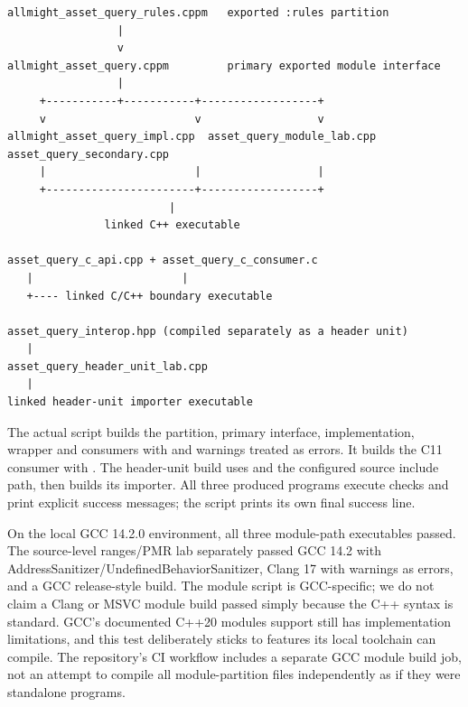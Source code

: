 \begin{verbatim}
allmight_asset_query_rules.cppm   exported :rules partition
                 |
                 v
allmight_asset_query.cppm         primary exported module interface
                 |
     +-----------+-----------+------------------+
     v                       v                  v
allmight_asset_query_impl.cpp  asset_query_module_lab.cpp  asset_query_secondary.cpp
     |                       |                  |
     +-----------------------+------------------+
                         |
               linked C++ executable

asset_query_c_api.cpp + asset_query_c_consumer.c
   |                       |
   +---- linked C/C++ boundary executable

asset_query_interop.hpp (compiled separately as a header unit)
   |
asset_query_header_unit_lab.cpp
   |
linked header-unit importer executable
\end{verbatim}

The actual script builds the partition, primary interface, implementation, wrapper and consumers with  and warnings treated as errors. It builds the C11 consumer with . The header-unit build uses  and the configured source include path, then builds its importer. All three produced programs execute checks and print explicit success messages; the script prints its own final success line.

On the local GCC 14.2.0 environment, all three module-path executables passed. The source-level ranges/PMR lab separately passed GCC 14.2 with AddressSanitizer/UndefinedBehaviorSanitizer, Clang 17 with warnings as errors, and a GCC release-style  build. The module script is GCC-specific; we do not claim a Clang or MSVC module build passed simply because the C++ syntax is standard. GCC's documented C++20 modules support still has implementation limitations, and this test deliberately sticks to features its local toolchain can compile. The repository's CI workflow includes a separate GCC module build job, not an attempt to compile all module-partition files independently as if they were standalone  programs.

